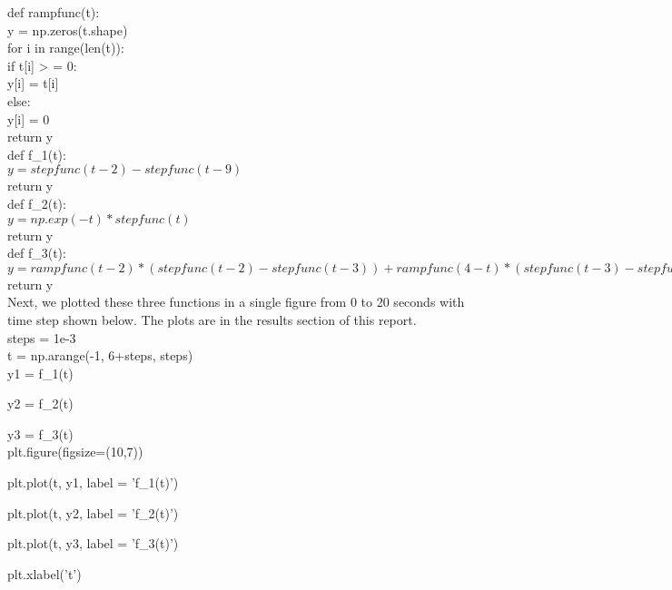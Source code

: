 \documentclass[12pt]{report}
\begin{document}
\indent def rampfunc(t):\\
\indent\indent    y = np.zeros(t.shape)\\
    
\indent\indent    for i in range(len(t)):\\
\indent\indent\indent        if t[i] > = 0:\\
\indent\indent\indent\indent            y[i] = t[i]\\
\indent\indent\indent        else:\\
\indent\indent\indent\indent            y[i] = 0\\
\indent\indent    return y\\
    
\indent def f_1(t):\\
\indent\indent $y = stepfunc(t-2) - stepfunc(t-9)$\\
\indent\indent return y\\

\indent def f_2(t):\\
\indent\indent $y = np.exp(-t)*stepfunc(t)$\\
\indent\indent return y\\

\indent def f_3(t):\\
\indent\indent $y = rampfunc(t-2)*(stepfunc(t-2)-stepfunc(t-3)) + rampfunc(4-t)*(stepfunc(t-3)-stepfunc(t-4))$\\
\indent\indent return y\\

\noindent Next, we plotted these three functions in a single figure from 0 to 20 seconds with time step shown below. The plots are in the results section of this report.\\

\indent steps = 1e-3\\
\indent t = np.arange(-1, 6+steps, steps)\\

\indent y1 = f_1(t)

\indent y2 = f_2(t)

\indent y3 = f_3(t)\\

   
\indent plt.figure(figsize=(10,7))

\indent plt.plot(t, y1, label = 'f_1(t)')

\indent plt.plot(t, y2, label = 'f_2(t)')

\indent plt.plot(t, y3, label = 'f_3(t)')

\indent plt.xlabel('t')
\end{document}

